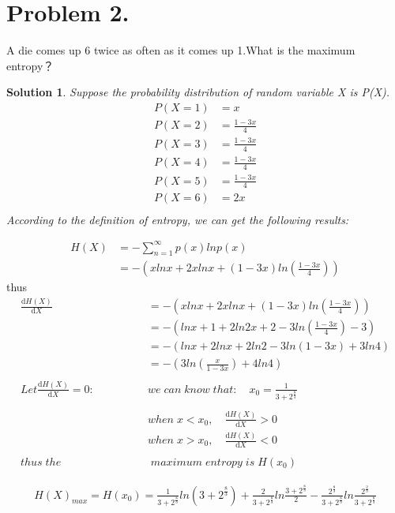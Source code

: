 \documentclass[UTF8,oneside]{article}
\newtheorem*{Solution}{Solution}
\begin{document}
\section*{Problem 2.} %
A die comes up 6 twice as often as it comes up 1.What is the maximum entropy？
\begin{Solution}
Suppose the probability distribution of random variable X is P(X).
\begin{align*}
P(X=1) &=x \\
P(X=2) &=\frac{1-3x}{4}   \\
P(X=3) &=\frac{1-3x}{4}  \\
P(X=4) &=\frac{1-3x}{4}   \\
P(X=5) &=\frac{1-3x}{4}  \\
P(X=6) &=2x  \\
\end{align*}
According to the definition of entropy, we can get the following results:
\end{Solution}
\begin{align*}
H(X) &=-\sum_{n=1}^\infty p(x)lnp(x) \\
&=-(xlnx+2xlnx+(1-3x)ln(\frac{1-3x}{4}))
\end{align*}
thus
\begin{align*}
\frac{\mathrm{d}H(X)}{\mathrm{d}X} &=-(xlnx+2xlnx+(1-3x)ln(\frac{1-3x}{4}))\\
&=-(lnx+1+2ln2x+2-3ln(\frac{1-3x}{4})-3)\\
&=-(lnx+2lnx+2ln2-3ln(1-3x)+3ln4)\\
&=-(3ln(\frac{x}{1-3x})+4ln4)\\
\\
Let \frac{\mathrm{d}H(X)}{\mathrm{d}X}=0:\qquad\qquad&we\; can\; know\;that:\quad x_0=\frac{1}{3+2^{\frac{8}{3}}}\\
\\
&when\; x<x_0,\quad\frac{\mathrm{d}H(X)}{\mathrm{d}X}>0\\
&when\;x>x_0,\quad\frac{\mathrm{d}H(X)}{\mathrm{d}X}<0\\
\\
thus\;the&\; maximum\;entropy\;is\;H(x_0)
\end{align*}

\begin{align*}
H(X)_{max}=H(x_0)=\frac{1}{3+2^{\frac{8}{3}}}ln(3+2^{\frac{8}{3}})+\frac{2}{3+2^{\frac{8}{3}}}ln\frac{3+2^{\frac{8}{3}}}{2}-\frac{2^{\frac{8}{3}}}{3+2^{\frac{8}{3}}}ln\frac{2^{\frac{2}{3}}}{3+2^{\frac{8}{3}}}
\end{align*}
\end{document}

